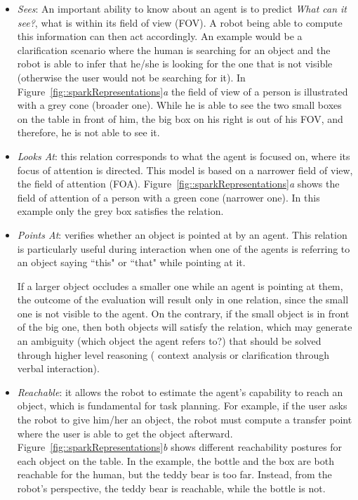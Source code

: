 \begin{itemize}

\item \emph{Sees}: An important ability to know about an agent is to predict
\emph{What can it see?}, \ie what is within its field of view (FOV). A robot being
able to compute this information can then act accordingly. An example would be
a clarification scenario where the human is searching for an object and the
robot is able to infer that he/she is looking for the one that is not visible
(otherwise the user would not be searching for it).  In
Figure~\ref{fig::sparkRepresentations}\emph{a} the field of view of a person is
illustrated with a grey cone (broader one). While he is able to see the two
small boxes on the table in front of him, the big box on his right is out of
his FOV, and therefore, he is not able to see it. 

\item \emph{Looks At}: this relation corresponds to what the agent is focused
on, \ie where its focus of attention is directed. This model is based on a
narrower field of view, the field of attention (FOA). 
Figure~\ref{fig::sparkRepresentations}\emph{a}
shows the field of attention of a person with a green cone (narrower one). In
this example only the grey box satisfies the  relation.

\item \emph{Points At}: verifies whether an object is pointed at by an agent.
This relation is particularly useful during interaction when one of the agents
is referring to an object saying ``this" or ``that" while pointing at it.
 
If a larger object occludes a smaller one while an agent is pointing at them, the
outcome of the evaluation will result only in one relation, \ie {} since the small one is not visible to the agent.  On the
contrary, if the small object is in front of the big one, then both objects
will satisfy the relation, which may generate an ambiguity (which object the
agent refers to?) that should be solved through higher level reasoning (\eg
context analysis or clarification through verbal interaction).

\item \emph{Reachable}: it allows the robot to estimate the agent's capability
to reach an object, which is fundamental for task planning. For example, if the
user asks the robot to give him/her an object, the robot must compute a transfer
point where the user is able to get the object afterward. 
Figure~\ref{fig::sparkRepresentations}\emph{b} shows different reachability postures for each object
on the table. In the example, the bottle and the box are both reachable for the
human, but the teddy bear is too far. Instead, from the robot's perspective,
the teddy bear is reachable, while the bottle is not.

\end{itemize}

